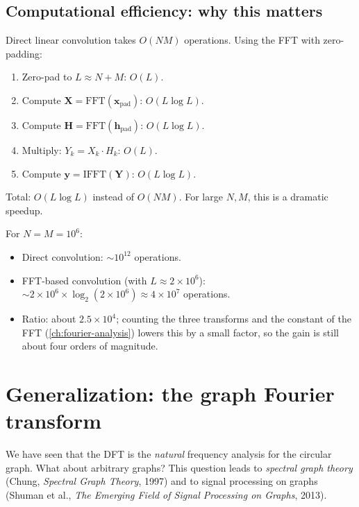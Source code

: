 \begin{notechapter}
\subsection{Computational efficiency: why this matters}

Direct linear convolution takes $O(NM)$ operations. Using the FFT with
zero-padding:

\begin{enumerate}
\item Zero-pad to $L \approx N+M$: $O(L)$.
\item Compute $\mathbf{X} = \text{FFT}(\mathbf{x}_{\text{pad}})$: $O(L \log L)$.
\item Compute $\mathbf{H} = \text{FFT}(\mathbf{h}_{\text{pad}})$: $O(L \log L)$.
\item Multiply: $Y_k = X_k \cdot H_k$: $O(L)$.
\item Compute $\mathbf{y} = \text{IFFT}(\mathbf{Y})$: $O(L \log L)$.
\end{enumerate}

Total: $O(L \log L)$ instead of $O(NM)$. For large $N, M$, this is a
dramatic speedup.

\begin{example}
For $N = M = 10^6$:
\begin{itemize}
\item Direct convolution: $\sim 10^{12}$ operations.
\item FFT-based convolution (with $L \approx 2\times10^6$):
      $\sim 2\times10^6 \times \log_2(2\times10^6) \approx 4\times10^7$
      operations.
\item Ratio: about $2.5\times10^4$; counting the three transforms and the constant of the FFT (\cref{ch:fourier-analysis}) lowers this by a small factor, so the gain is still about four orders of magnitude.
\end{itemize}
\end{example}

\section{Generalization: the graph Fourier transform}

We have seen that the DFT is the \emph{natural} frequency analysis for the
circular graph. What about arbitrary graphs? This question leads to
\emph{spectral graph theory} (Chung, \emph{Spectral Graph Theory}, 1997) and to signal processing on graphs (Shuman et al., \emph{The Emerging Field of Signal Processing on Graphs}, 2013).


\end{notechapter}
